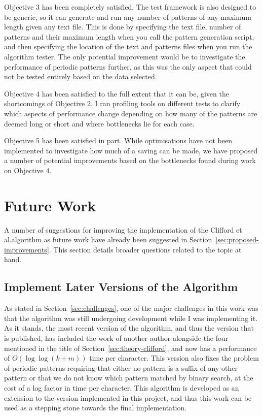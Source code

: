 \documentclass[ %
                    author={Dominic Joseph Moylett},
                    degree={MEng},
                     title={Dictionary Matching with Fingerprints},
                  subtitle={An Empirical Analysis},
                      type={research},
                      year={2015} ]{dissertation}
\begin{document}
Objective 3 has been completely satisfied. The test framework is also designed to be generic, so it can generate and run any number of patterns of any maximum length given any text file. This is done by specifying the text file, number of patterns and their maximum length when you call the pattern generation script, and then specifying the location of the text and patterns files when you run the algorithm tester. The only potential improvement would be to investigate the performance of periodic patterns further, as this was the only aspect that could not be tested entirely based on the data selected.

Objective 4 has been satisfied to the full extent that it can be, given the shortcomings of Objective 2. I ran profiling tools on different tests to clarify which aspects of performance change depending on how many of the patterns are deemed long or short and where bottlenecks lie for each case.

Objective 5 has been satisfied in part. While optimisations have not been implemented to investigate how much of a saving can be made, we have proposed a number of potential improvements based on the bottlenecks found during work on Objective 4.

\section{Future Work}

A number of suggestions for improving the implementation of the Clifford et al.\@ algorithm as future work have already been suggested in Section~\ref{sec:proposed-improvements}. This section details broader questions related to the topic at hand.

\subsection{Implement Later Versions of the Algorithm}

As stated in Section~\ref{sec:challenges}, one of the major challenges in this work was that the algorithm was still undergoing development while I was implementing it. As it stands, the most recent version of the algorithm, and thus the version that is published, has included the work of another author alongside the four mentioned in the title of Section~\ref{sec:theory-clifford}, and now has a performance of $O(\log\log(k + m))$ time per character. This version also fixes the problem of periodic patterns requiring that either no pattern is a suffix of any other pattern or that we do not know which pattern matched by binary search, at the cost of a log factor in time per character. This algorithm is developed as an extension to the version implemented in this project, and thus this work can be used as a stepping stone towards the final implementation.
\end{document}
